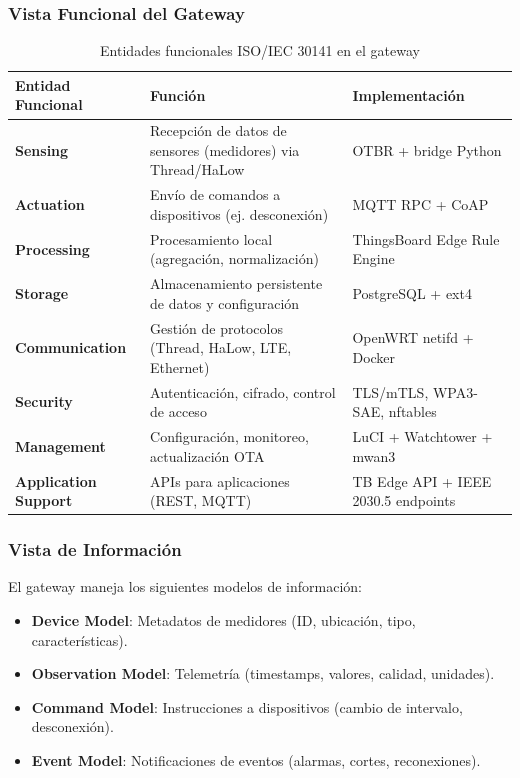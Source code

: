 \subsubsection{Vista Funcional del Gateway}

\begin{table}[h]
\centering
\small
\begin{tabular}{|l|p{7cm}|p{3.5cm}|}
\hline
\textbf{Entidad Funcional} & \textbf{Función} & \textbf{Implementación} \\
\hline
\textbf{Sensing} & Recepción de datos de sensores (medidores) via Thread/HaLow & OTBR + bridge Python \\
\hline
\textbf{Actuation} & Envío de comandos a dispositivos (ej. desconexión) & MQTT RPC + CoAP \\
\hline
\textbf{Processing} & Procesamiento local (agregación, normalización) & ThingsBoard Edge Rule Engine \\
\hline
\textbf{Storage} & Almacenamiento persistente de datos y configuración & PostgreSQL + ext4 \\
\hline
\textbf{Communication} & Gestión de protocolos (Thread, HaLow, LTE, Ethernet) & OpenWRT netifd + Docker \\
\hline
\textbf{Security} & Autenticación, cifrado, control de acceso & TLS/mTLS, WPA3-SAE, nftables \\
\hline
\textbf{Management} & Configuración, monitoreo, actualización OTA & LuCI + Watchtower + mwan3 \\
\hline
\textbf{Application Support} & APIs para aplicaciones (REST, MQTT) & TB Edge API + IEEE 2030.5 endpoints \\
\hline
\end{tabular}
\caption{Entidades funcionales ISO/IEC 30141 en el gateway}
\end{table}

\subsubsection{Vista de Información}

El gateway maneja los siguientes modelos de información:

\begin{itemize}
    \item \textbf{Device Model}: Metadatos de medidores (ID, ubicación, tipo, características).
    \item \textbf{Observation Model}: Telemetría (timestamps, valores, calidad, unidades).
    \item \textbf{Command Model}: Instrucciones a dispositivos (cambio de intervalo, desconexión).
    \item \textbf{Event Model}: Notificaciones de eventos (alarmas, cortes, reconexiones).
\end{itemize}

